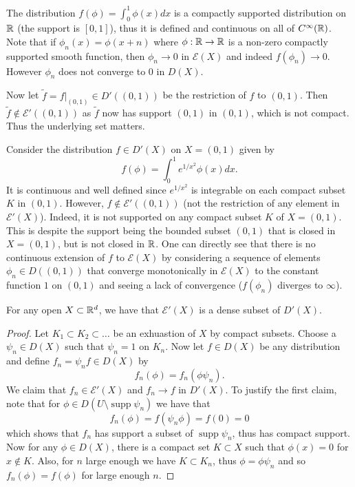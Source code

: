 \documentclass[twoside, a4paper, 10pt]{amsart}
\begin{document}
\begin{eg} The distribution $f(\phi) = \int_{0}^1 \phi(x) dx $ is a compactly supported distribution on $\mathbb{R}$ (the support is $[0,1]$), thus it is defined and continuous on all of $C^{\infty}(\mathbb{R})$. Note that if $\phi_n(x) = \phi(x+n)$ where $\phi:\mathbb{R} \to \mathbb{R}$ is a non-zero compactly supported smooth function, then $\phi_n \to 0$ in $\mathcal{E}(X)$ and indeed $f(\phi_n) \to 0$. However $\phi_n$ does not converge to $0$ in $D(X)$. 

Now let $\tilde{f} = f|_{(0,1)} \in D'((0,1))$ be the restriction of $f$ to $(0,1)$. Then $\tilde{f} \notin \mathcal{E}'((0,1))$ as $\tilde{f}$ now has support $(0,1)$ in $(0,1)$, which is not compact. Thus the underlying set matters. \end{eg}

\begin{eg}\label{eg: restriction not compact} Consider the distribution $f \in D'(X)$ on $X=(0,1)$ given by $$f(\phi) = \int_{0}^1 e^{1/x^2} \phi(x) dx.$$ It is continuous and well defined since $e^{1/x^2}$ is integrable on each compact subset $K$ in $(0,1)$. However, $f \notin \mathcal{E}'((0,1))$ (not the restriction of any element in $\mathcal{E}'(X)$). Indeed, it is not supported on any compact subset $K$ of $X=(0,1)$. This is despite the support being the bounded subset $(0,1)$ that is closed in $X=(0,1)$, but is not closed in $\mathbb{R}$. One can directly see that there is no continuous extension of $f$ to $\mathcal{E}(X)$ by considering a sequence of elements $\phi_n \in D((0,1))$ that converge monotonically in $\mathcal{E}(X)$ to the constant function $1$ on $(0,1)$ and seeing a lack of convergence ($f(\phi_n)$ diverges to $\infty$).

\end{eg}

\begin{thm} For any open $X \subset \mathbb{R}^d$, we have that $\mathcal{E}'(X)$ is a dense subset of $D'(X)$.

\end{thm}

\begin{proof} Let $K_1 \subset K_2 \subset \ldots $ be an exhuastion of $X$ by compact subsets. Choose a $\psi_n \in D(X)$ such that $\psi_n = 1$ on $K_n$. Now let $f \in D(X)$ be any distribution and define $f_n = \psi_n f \in D(X)$ by $$f_n(\phi) = f_n(\phi \psi_n).$$ We claim that $f_n \in \mathcal{E}'(X)$ and $f_n \to f$ in $D'(X)$. To justify the first claim, note that for $\phi \in D(U \setminus \operatorname{supp} \psi_n)$ we have that $$f_n(\phi) = f(\psi_n \phi) = f(0) = 0$$ which shows that $f_n$ has support a subset of $\operatorname{supp} \psi_n$, thus has compact support. Now for any $\phi \in D(X)$, there is a compact set $K \subset X$ such that $\phi(x) = 0$ for $x \notin K$. Also, for $n$ large enough we have $K \subset K_n$, thus $\phi = \phi \psi_n$ and so $f_n(\phi) = f(\phi)$ for large enough $n$. \end{proof}
\end{document}
